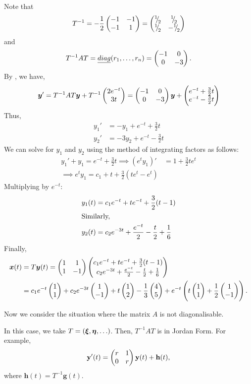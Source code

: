 \begin{eg}
	Note that 
	\[
	T^{-1} = -\frac{1}{2} \begin{pmatrix}-1 & -1 \\ -1 & 1\end{pmatrix} = \begin{pmatrix}{}^{1}{\mskip -5mu/\mskip -3mu}_{2} & {}^{1}{\mskip -5mu/\mskip -3mu}_{2} \\ {}^{1}{\mskip -5mu/\mskip -3mu}_{2} & -{}^{1}{\mskip -5mu/\mskip -3mu}_{2}\end{pmatrix}
	\] 
	and 
	\[
	T^{-1} A T = \emph{diag}(r_1,\ldots,r_n) = \begin{pmatrix}-1 & 0 \\0 & -3\end{pmatrix}. 
	\]
	By , we have,
	\[
	\bm{y}' = T^{-1} A T \bm{y} + T^{-1} \begin{pmatrix}2 e^{-t} \\ 3t\end{pmatrix} = \begin{pmatrix}-1 & 0 \\0 & -3\end{pmatrix} \bm{y} + \begin{pmatrix}e^{-t}+\frac{3}{2}t \\ e^{-t}-\frac{3}{2}t\end{pmatrix}
	\]
	Thus,
	\begin{align*}
		y_1' &= -y_1 + e^{-t} +\frac{3}{2}t \\
		y_2' &= -3y_2 + e^{-t} -\frac{3}{2}t
	\end{align*}
	We can solve for $y_1$ and $y_2$ using the method of integrating factors as follows:
	\begin{align*}
		y_1'+y_1 = e^{-t} +\frac{3}{2}t \implies (e^ty_1)' &= 1 + \frac{3}{2}te^t \\
		\implies e^ty_1 = c_1 + t + \frac{3}{2}(te^t - e^t)
	\end{align*}
	Multiplying by $e^{-t}$:
	\begin{align}
		y_1(t) &= c_1 e^{-t} + t e^{-t} + \frac{3}{2}(t-1) \\
		\intertext{Similarly,}
		y_2(t) &= c_2e^{-3t} + \frac{e^{-t}}{2} - \frac{t}{2} + \frac{1}{6}
	\end{align}
	Finally,
	\begin{align*}
		\bm{x}(t) &= T \bm{y}(t) = \begin{pmatrix}1 &1 \\ 1 &-1\end{pmatrix} \begin{pmatrix}c_1 e^{-t} + t e^{-t} + \frac{3}{2}(t-1) \\ c_2e^{-3t} + \frac{e^{-t}}{2} - \frac{t}{2} + \frac{1}{6}\end{pmatrix} \\
		&= c_1e^{-t}\begin{pmatrix}1\\1\end{pmatrix} + c_2e^{-3t}\begin{pmatrix}1\\-1\end{pmatrix} + t\begin{pmatrix}1\\2\end{pmatrix} - \frac{1}{3}\begin{pmatrix}4\\5\end{pmatrix} + e^{-t}\left(t\begin{pmatrix}1\\1\end{pmatrix} + \frac12\begin{pmatrix}1\\-1\end{pmatrix} \right).
	\end{align*}
\end{eg}

Now we consider the situation where the matrix $A$ is not diagonalisable.

In this case, we take $T = (\bm{\xi}, \bm{\eta}, \ldots)$. Then, $T^{-1}AT$ is in Jordan Form. For example,
\[
\textbf{y}'(t) = \begin{pmatrix}r & 1 \\0 & r\end{pmatrix} \textbf{y}(t) +\textbf{h}(t),
\]
where $\textbf{h}(t) = T^{-1}\textbf{g}(t)$.

